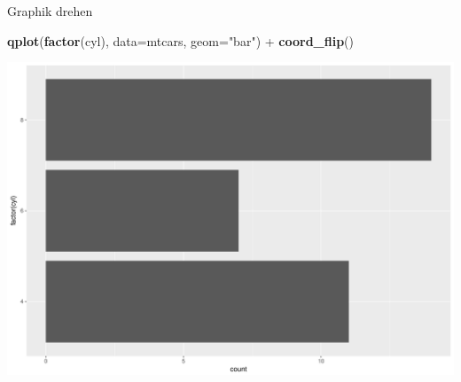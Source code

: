 \documentclass[ignorenonframetext,]{beamer}
\newenvironment{Shaded}{}{}
\newcommand{\KeywordTok}[1]{\textcolor[rgb]{0.00,0.44,0.13}{\textbf{{#1}}}}
\newcommand{\DataTypeTok}[1]{\textcolor[rgb]{0.56,0.13,0.00}{{#1}}}
\newcommand{\StringTok}[1]{\textcolor[rgb]{0.25,0.44,0.63}{{#1}}}
\newcommand{\NormalTok}[1]{{#1}}
\begin{document}
\begin{frame}[fragile]{Graphik drehen}

\begin{Shaded}
\begin{Highlighting}[]
\KeywordTok{qplot}\NormalTok{(}\KeywordTok{factor}\NormalTok{(cyl), }\DataTypeTok{data=}\NormalTok{mtcars, }\DataTypeTok{geom=}\StringTok{"bar"}\NormalTok{) +}\StringTok{ }
\KeywordTok{coord_flip}\NormalTok{()}
\end{Highlighting}
\end{Shaded}

\includegraphics{R_intern_files/figure-beamer/unnamed-chunk-249-1.pdf}

\end{frame}
\end{document}
